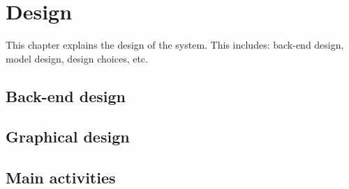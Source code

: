 \chapter{Design} \label{cha:design}
	This chapter explains the design of the system. This includes: back-end
	design, model design, design choices, etc. 
	\section{Back-end design}
	
	
	\section{Graphical design}
	
	
	\section{Main activities}
